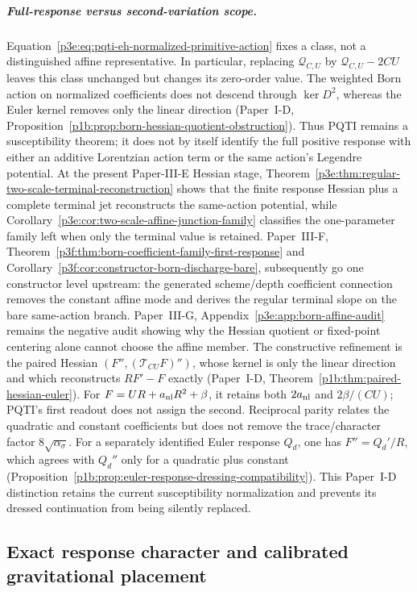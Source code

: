 \documentclass[12pt,a4paper]{article}
\begin{document}
\subparagraph{Full-response versus second-variation scope.}
Equation~\eqref{p3e:eq:pqti-eh-normalized-primitive-action} fixes a class,
not a distinguished affine representative. In particular, replacing
\(\mathscr Q_{C,U}\) by \(\mathscr Q_{C,U}-2CU\) leaves this class unchanged
but changes its zero-order value. The weighted Born action on normalized
coefficients does not descend through \(\ker D^2\), whereas the Euler
kernel removes only the linear direction (Paper~I-D,
Proposition~\ref{p1b:prop:born-hessian-quotient-obstruction}). Thus PQTI
remains a susceptibility theorem; it does not by itself identify the full
positive response with either an additive Lorentzian action term or the
same action's Legendre potential.  At the present Paper-III-E Hessian stage,
Theorem~\ref{p3e:thm:regular-two-scale-terminal-reconstruction} shows that
the finite response Hessian plus a complete terminal jet reconstructs the
same-action potential, while
Corollary~\ref{p3e:cor:two-scale-affine-junction-family} classifies the
one-parameter family left when only the terminal value is retained.  Paper~III-F,
Theorem~\ref{p3f:thm:born-coefficient-family-first-response} and
Corollary~\ref{p3f:cor:constructor-born-discharge-bare}, subsequently go one
constructor level upstream: the generated scheme/depth coefficient connection
removes the constant affine mode and derives the regular terminal slope on the
bare same-action branch.  Paper~III-G, Appendix~\ref{p3e:app:born-affine-audit} remains the
negative audit showing why the Hessian quotient or fixed-point centering alone
cannot choose the affine member.
The constructive refinement is the paired Hessian
\((F'',(\mathcal T_{CU}F)'')\), whose kernel is only the linear
direction and which reconstructs \(RF'-F\) exactly (Paper~I-D,
Theorem~\ref{p1b:thm:paired-hessian-euler}). For
\(F=UR+a_{\rm nl}R^2+\beta\), it retains both
\(2a_{\rm nl}\) and \(2\beta/(CU)\); PQTI's first readout does
not assign the second. Reciprocal parity relates the quadratic and
constant coefficients but does not remove the trace/character factor
\(8\sqrt{\alpha_\sigma}\).
For a separately identified Euler response \(Q_d\), one has
\(F''=Q_d'/R\), which agrees with \(Q_d''\) only for a quadratic
plus constant (Proposition~\ref{p1b:prop:euler-response-dressing-compatibility}).
This Paper~I-D distinction retains the current susceptibility normalization and
prevents its dressed continuation from being silently replaced.


\subsection{Exact response character and calibrated gravitational placement}
\label{p3:sec:master-lagrangian-closed}
\end{document}
